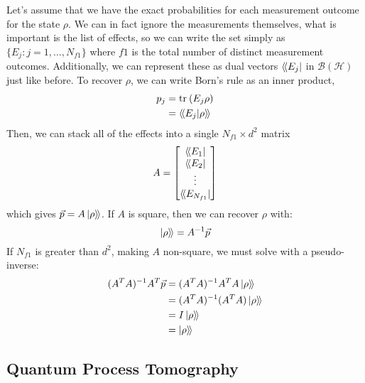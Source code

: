 Let's assume that we have the exact probabilities for each measurement outcome for the state $\rho$.
We can in fact ignore the measurements themselves, what is important is the list of effects, so we
can write the set simply as $\{ E_j : j = 1, \dots, N_{f1}\}$ where $f1$ is the total number of
distinct measurement outcomes. Additionally, we can represent these as dual vectors $\langle\!\bra{E_j}$
in $\mathcal{B(H)}$ just like before. To recover $\rho$, we can write Born's rule as an inner
product, 
\begin{equation}
    \begin{aligned}
        p_j &= \text{tr}_{}\left(E_j \rho\right) \\
            &= \langle\!\braket{E_j | \rho}\!\rangle
    \end{aligned}
\end{equation}
Then, we can stack all of the effects into a single $N_{f1} \times d^2$ matrix
\begin{equation}
    A = \begin{bmatrix}
        \langle\!\bra{E_1} \\
        \langle\!\bra{E_2} \\
        \vdots \\
        \langle\!\bra{E_{N_{f1}}}
    \end{bmatrix}
\end{equation}
which gives $\vec{p} = A \ket{\rho}\!\rangle$. If $A$ is square, then we can recover $\rho$ with:
\begin{equation}
    \ket{\rho}\!\rangle = A^{-1} \vec{p}
\end{equation}
If $N_{f1}$ is greater than $d^2$, making $A$ non-square, we must solve with a pseudo-inverse:
\begin{equation}
    \begin{aligned}
        (A^T A)^{-1} A^T \vec{p} &= (A^T A)^{-1} A^T A \ket{\rho}\!\rangle \\
                                 &= (A^T A)^{-1} (A^T A) \ket{\rho}\!\rangle \\
                                 &= I \ket{\rho}\!\rangle \\
                                 &= \ket{\rho}\!\rangle
    \end{aligned}
\end{equation}

\subsection{Quantum Process Tomography}

